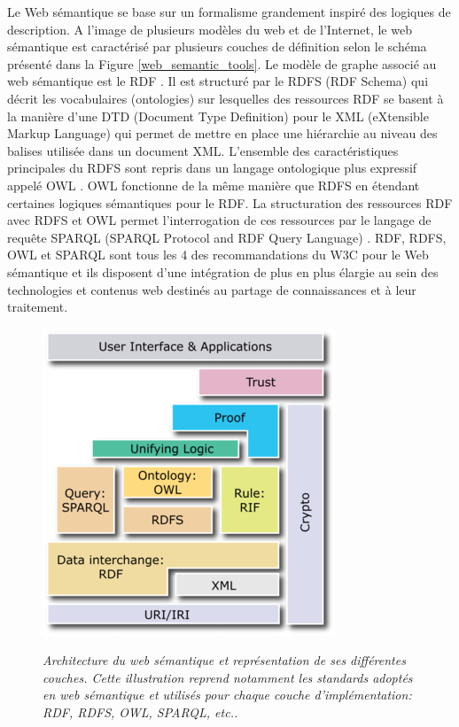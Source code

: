 Le Web sémantique se base sur un formalisme grandement inspiré des logiques de description. A l'image de plusieurs modèles du web et de l'Internet, le web sémantique est caractérisé par plusieurs couches de définition selon le schéma présenté dans la Figure \ref{web_semantic_tools}. Le modèle de graphe associé au web sémantique est le RDF \cite{klyne2006resource}. Il est structuré par le RDFS (RDF Schema) \cite{brickley2004rdf} qui décrit les vocabulaires (ontologies) sur lesquelles des ressources RDF se basent à la manière d'une DTD (Document Type Definition) pour le XML (eXtensible Markup Language) qui permet de mettre en place une hiérarchie au niveau des balises utilisée dans un document XML. 
L'ensemble des caractéristiques principales du RDFS sont repris dans un langage ontologique plus expressif appelé OWL \cite{mcguinness2004owl}. OWL fonctionne de la même manière que RDFS en étendant certaines logiques sémantiques pour le RDF. La structuration des ressources RDF avec RDFS et OWL permet l'interrogation de ces ressources par le langage de requête SPARQL (SPARQL Protocol and RDF Query Language) \cite{prud2008sparql}. RDF, RDFS, OWL et SPARQL sont tous les 4 des recommandations du W3C pour le Web sémantique et ils disposent d'une intégration de plus en plus élargie au sein des technologies et contenus web destinés au partage de connaissances et à leur traitement.

\begin{figure}
  \centering
  {\includegraphics[width=.5\linewidth]{./figures/ch2/web_semantic_hierarchy}}
    \caption{\it Architecture du web sémantique et représentation de ses différentes couches. Cette illustration reprend notamment les standards adoptés en web sémantique et utilisés pour chaque couche d'implémentation: RDF, RDFS, OWL, SPARQL, etc..}
  \label{Fig:web_semantic_hierarchy}
  \hspace{0.3cm}
\end{figure}

